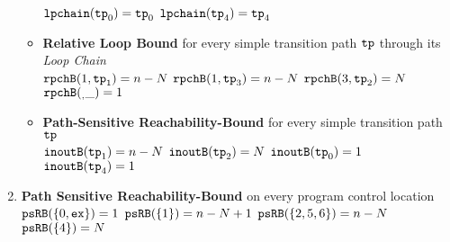 \begin{enumerate}
\begin{itemize}
  $\mathtt{lpchain}(\mathtt{tp}_0) = \mathtt{tp}_0$ \quad
  $\mathtt{lpchain}(\mathtt{tp}_4) = \mathtt{tp}_4$
  \item \textbf{{Relative Loop Bound}} for every simple transition path $\mathtt{tp}$ through its \emph{Loop Chain}
  \\
  $\mathtt{rpchB}(1, \mathtt{tp}_1) = n - N$ \quad
  $\mathtt{rpchB}(1, \mathtt{tp}_3) = n - N$ \quad
   \quad
  $\mathtt{rpchB}(3, \mathtt{tp}_2) = N$ \quad
  $\mathtt{rpchB}(_, \_) = 1 $ 
  \item \textbf{Path-Sensitive Reachability-Bound} for every simple transition path $\mathtt{tp}$
  \\
  $\mathtt{inoutB}(\mathtt{tp}_1) = n - N$ \quad
  $\mathtt{inoutB}(\mathtt{tp}_2) = N$ \quad
  $\mathtt{inoutB}(\mathtt{tp}_0) = 1$ 
  \\
   \quad
  $\mathtt{inoutB}(\mathtt{tp}_4) = 1$ 
  \end{itemize}
\item \textbf{Path Sensitive Reachability-Bound} on every program control location
\\
$\mathtt{psRB}(\{0, \mathtt{ex}\}) = 1$ \quad
$\mathtt{psRB}(\{1\}) = n - N + 1$ \quad
$\mathtt{psRB}(\{2, 5, 6\}) = n - N$ \\
 \quad
$\mathtt{psRB}(\{4\}) = N$
\end{enumerate}